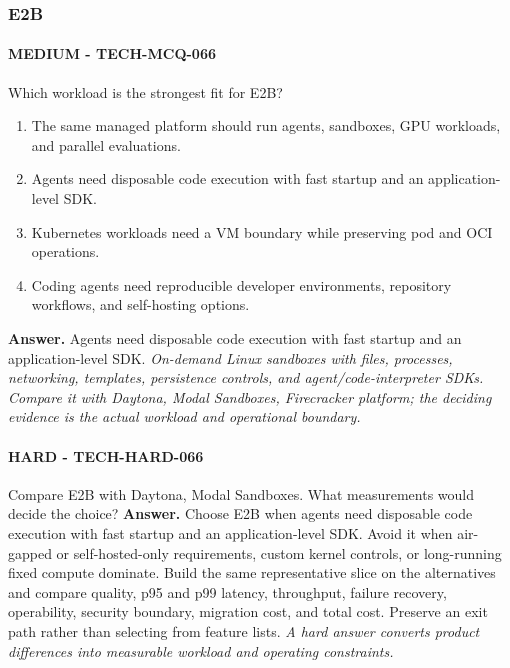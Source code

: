 \subsubsection*{E2B}
\paragraph{MEDIUM - TECH-MCQ-066} Which workload is the strongest fit for E2B?
\begin{enumerate}[label=\Alph*.]
\item The same managed platform should run agents, sandboxes, GPU workloads, and parallel evaluations.
\item Agents need disposable code execution with fast startup and an application-level SDK.
\item Kubernetes workloads need a VM boundary while preserving pod and OCI operations.
\item Coding agents need reproducible developer environments, repository workflows, and self-hosting options.
\end{enumerate}
\textbf{Answer.} Agents need disposable code execution with fast startup and an application-level SDK.
\textit{On-demand Linux sandboxes with files, processes, networking, templates, persistence controls, and agent/code-interpreter SDKs. Compare it with Daytona, Modal Sandboxes, Firecracker platform; the deciding evidence is the actual workload and operational boundary.}
\paragraph{HARD - TECH-HARD-066} Compare E2B with Daytona, Modal Sandboxes. What measurements would decide the choice?
\textbf{Answer.} Choose E2B when agents need disposable code execution with fast startup and an application-level SDK. Avoid it when air-gapped or self-hosted-only requirements, custom kernel controls, or long-running fixed compute dominate. Build the same representative slice on the alternatives and compare quality, p95 and p99 latency, throughput, failure recovery, operability, security boundary, migration cost, and total cost. Preserve an exit path rather than selecting from feature lists.
\textit{A hard answer converts product differences into measurable workload and operating constraints.}
